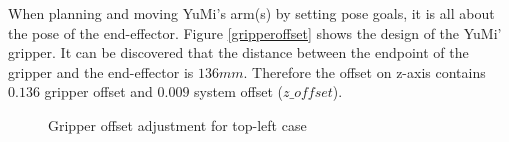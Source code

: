 When planning and moving YuMi's arm(s) by setting pose goals, it is all about the pose of the end-effector. Figure \ref{gripperoffset} shows the design of the YuMi' gripper. It can be discovered that the distance between the endpoint of the gripper and the end-effector is $136mm$. Therefore the offset on z-axis contains $0.136$ gripper offset and $0.009$ system offset ($z\_offset$).

\begin{figure}[H]
\centering
{}
\caption{Gripper offset adjustment for top-left case}
\label{offset}
\end{figure}

